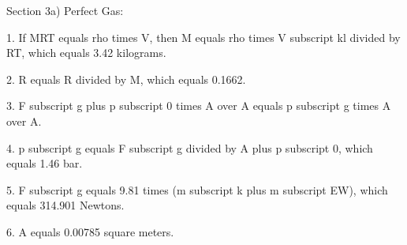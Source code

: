 Section 3a) Perfect Gas:

1. If MRT equals rho times V, then M equals rho times V subscript kl divided by RT, which equals 3.42 kilograms.

2. R equals R divided by M, which equals 0.1662.

3. F subscript g plus p subscript 0 times A over A equals p subscript g times A over A.

4. p subscript g equals F subscript g divided by A plus p subscript 0, which equals 1.46 bar.

5. F subscript g equals 9.81 times (m subscript k plus m subscript EW), which equals 314.901 Newtons.

6. A equals 0.00785 square meters.